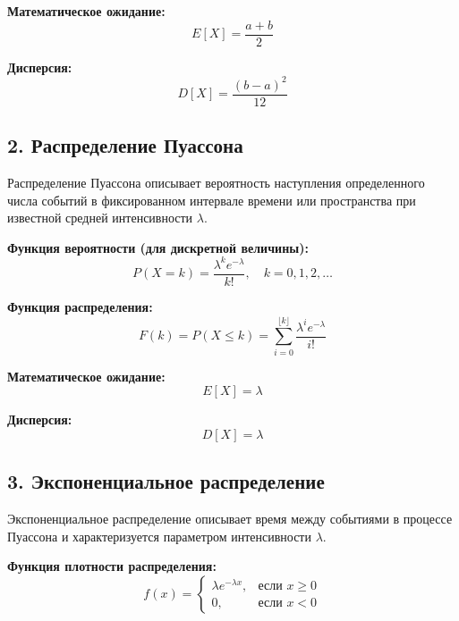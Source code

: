 \textbf{Математическое ожидание:}
\begin{equation}
E[X] = \frac{a + b}{2}
\end{equation}

\textbf{Дисперсия:}
\begin{equation}
D[X] = \frac{(b - a)^2}{12}
\end{equation}

\subsection*{2. Распределение Пуассона}

Распределение Пуассона описывает вероятность наступления определенного числа событий в фиксированном интервале времени или пространства при известной средней интенсивности $\lambda$.

\textbf{Функция вероятности (для дискретной величины):}
\begin{equation}
P(X = k) = \frac{\lambda^k e^{-\lambda}}{k!}, \quad k = 0, 1, 2, \ldots
\end{equation}

\textbf{Функция распределения:}
\begin{equation}
F(k) = P(X \leq k) = \sum_{i=0}^{\lfloor k \rfloor} \frac{\lambda^i e^{-\lambda}}{i!}
\end{equation}

\textbf{Математическое ожидание:}
\begin{equation}
E[X] = \lambda
\end{equation}

\textbf{Дисперсия:}
\begin{equation}
D[X] = \lambda
\end{equation}

\subsection*{3. Экспоненциальное распределение}

Экспоненциальное распределение описывает время между событиями в процессе Пуассона и характеризуется параметром интенсивности $\lambda$.

\textbf{Функция плотности распределения:}
\begin{equation}
f(x) = 
\begin{cases}
\lambda e^{-\lambda x}, & \text{если } x \geq 0 \\
0, & \text{если } x < 0
\end{cases}
\end{equation}

